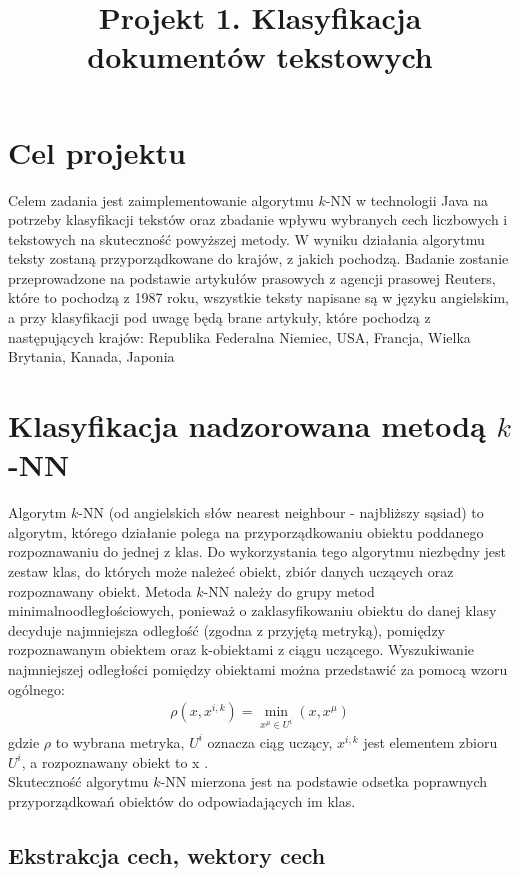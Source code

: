 \documentclass{classrep}
\author{
  \studentinfo{Hubert Gawłowski}{224298} \and
  \studentinfo{Kamil Kiszko-Zgierski}{224328} }
\title{Projekt 1. Klasyfikacja dokumentów tekstowych}
\begin{document}
\maketitle

\section{Cel projektu}

Celem zadania jest zaimplementowanie algorytmu $k$-NN w technologii Java na potrzeby klasyfikacji tekstów
oraz zbadanie wpływu wybranych cech liczbowych i tekstowych na skuteczność powyższej metody. W wyniku działania algorytmu teksty zostaną przyporządkowane do krajów, z jakich pochodzą.
Badanie zostanie przeprowadzone na podstawie artykułów prasowych z agencji prasowej Reuters, które to pochodzą z 1987 roku, wszystkie teksty napisane są w języku angielskim, a przy klasyfikacji pod uwagę będą brane artykuły, które pochodzą z następujących krajów: Republika Federalna Niemiec, USA, Francja, Wielka Brytania, Kanada, Japonia  \\


\section{Klasyfikacja nadzorowana metodą $k$-NN}
Algorytm $k$-NN (od angielskich słów nearest neighbour - najbliższy sąsiad) to algorytm, 
którego działanie polega na przyporządkowaniu obiektu poddanego rozpoznawaniu do jednej z klas.
 Do wykorzystania tego algorytmu niezbędny jest zestaw klas, do których może należeć obiekt, zbiór danych uczących oraz rozpoznawany obiekt.
Metoda $k$-NN należy do grupy metod minimalnoodległościowych, ponieważ o zaklasyfikowaniu obiektu 
do danej klasy decyduje najmniejsza odległość (zgodna z przyjętą metryką), pomiędzy rozpoznawanym obiektem oraz k-obiektami z ciągu uczącego. 
Wyszukiwanie najmniejszej odległości pomiędzy obiektami można przedstawić za pomocą wzoru ogólnego:
\begin{gather}
\rho(x, x ^ {i, k})= \min_{x^\mu \in U^i}(x, x^\mu)
\end{gather}
\indent gdzie $\rho$ to wybrana metryka, $U^i$ oznacza ciąg uczący, $x^{i, k}$ jest elementem zbioru $U^i$, a rozpoznawany obiekt to x \cite{tadeusiewicz90}.\\
\indent Skuteczność algorytmu $k$-NN  mierzona jest na podstawie odsetka poprawnych przyporządkowań obiektów do odpowiadających im klas. 


\subsection{Ekstrakcja cech, wektory cech}
\end{document}
